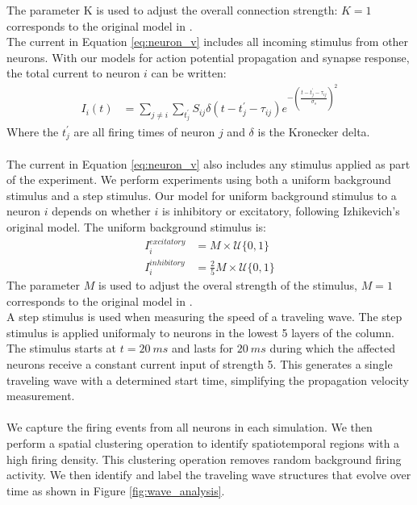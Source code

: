 \documentclass[a4paper,11pt]{article}
\begin{document}
The parameter K is used to adjust the overall connection strength: $K=1$ corresponds to the original model in \cite{izzy_code}. \\
The current in Equation \ref{eq:neuron_v} includes all incoming stimulus from other neurons.
With our models for action potential propagation and synapse response, the total current to neuron $i$ can be written:
\begin{align}
 I_i(t) &= \sum_{j\ne i} \sum_{t^\prime_j} S_{ij}  \delta(t-t^\prime_j-\tau_{ij})e^{-(\frac{t-t^\prime_j-\tau_{ij}}{\sigma_s})^2}
\end{align}
Where the $t^\prime_j$ are all firing times of neuron $j$ and $\delta$ is the Kronecker delta.
\\ \\
The current in Equation \ref{eq:neuron_v} also includes any stimulus applied as part of the experiment.
We perform experiments using both a uniform background stimulus and a step stimulus.
Our model for uniform background stimulus to a neuron $i$ depends on whether $i$ is inhibitory or excitatory, following Izhikevich's original model.
The uniform background stimulus is:
\begin{align}
 I_i^{excitatory} &= M \times \mathcal{U}\{0,1 \} \\
 I_i^{inhibitory} &= \frac{2}{5} M \times \mathcal{U}\{0,1 \}
\end{align}
The parameter $M$ is used to adjust the overal strength of the stimulus, $M=1$ corresponds to the original model in \cite{izzy_code}.
\\
A step stimulus is used when measuring the speed of a traveling wave.
The step stimulus is applied uniformaly to neurons in the lowest 5 layers of the column.
The stimulus starts at $t=20~ms$ and lasts for $20~ms$ during which the affected neurons receive a constant current input of strength 5.
This generates a single traveling wave with a determined start time, simplifying the propagation velocity measurement.
\\ \\
We capture the firing events from all neurons in each simulation.
We then perform a spatial clustering operation to identify spatiotemporal regions with a high firing density.
This clustering operation removes random background firing activity.
We then identify and label the traveling wave structures that evolve over time as shown in Figure \ref{fig:wave_analysis}.
\end{document}
